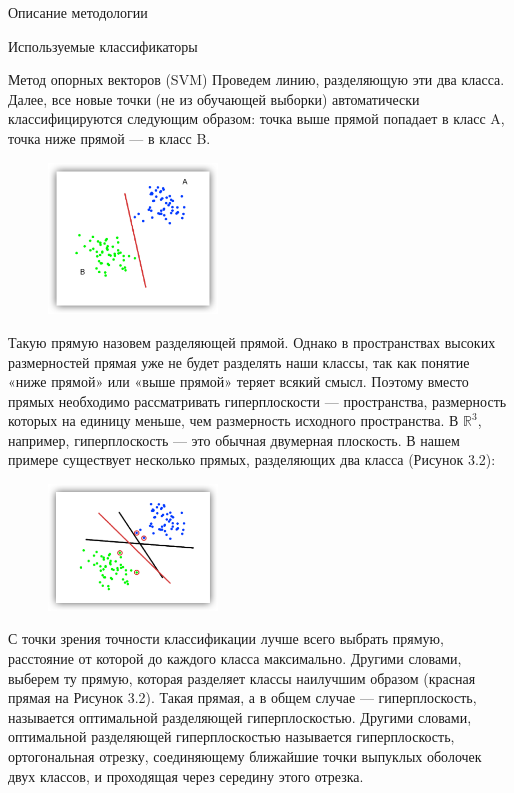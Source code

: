 \begin{section}{Описание методологии}
\begin{subsection}{Используемые классификаторы}
\begin{subsubsection}{Метод опорных векторов (SVM)}
  Проведем линию, разделяющую эти два класса. Далее, все новые точки (не из обучающей выборки) автоматически классифицируются следующим образом:
точка выше прямой попадает в класс A,
точка ниже прямой — в класс B.

\begin{figure}[ht!]
\centering
\includegraphics[width=0.4\textwidth]{pics/SVM1}
\caption{}
\label{pic:SVM1}
\end{figure}

Такую прямую назовем разделяющей прямой. Однако в пространствах высоких размерностей прямая уже не будет разделять наши классы, так как понятие «ниже прямой» или «выше прямой» теряет всякий смысл. Поэтому вместо прямых необходимо рассматривать гиперплоскости — пространства, размерность которых на единицу меньше, чем размерность исходного пространства. В $\mathbb{R}^3$, например, гиперплоскость — это обычная двумерная плоскость.
В нашем примере существует несколько прямых, разделяющих два класса (Рисунок 3.2):

\begin{figure}[ht!]
\centering
\includegraphics[width=0.4\textwidth]{pics/SVM2}
\caption{}
\label{pic:SVM2}
\end{figure}

С точки зрения точности классификации лучше всего выбрать прямую, расстояние от которой до каждого класса максимально. Другими словами, выберем ту прямую, которая разделяет классы наилучшим образом (красная прямая на Рисунок 3.2). Такая прямая, а в общем случае — гиперплоскость, называется оптимальной разделяющей гиперплоскостью.
Другими словами, оптимальной разделяющей гиперплоскостью называется гиперплоскость, ортогональная отрезку, соединяющему ближайшие точки выпуклых оболочек двух классов, и проходящая через середину этого отрезка.


\end{subsubsection}
\end{subsection}
\end{section}
